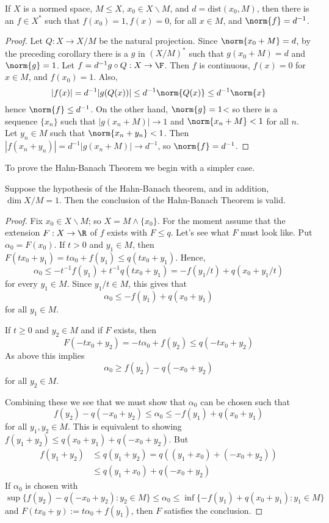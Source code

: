 \begin{cor}\label{cor:distFunc}
    If $X$ is a normed space, $M \leq X$, $x_0 \in X\backslash M$, and $d = \text{dist}(x_0,M)$, then there is an $f \in X^*$ such that $f(x_0) = 1, f(x) = 0$, for all $x \in M$, and $\norm{f} = d^{-1}$.
\end{cor}
\begin{proof}
    Let $Q:X\rightarrow X/M$ be the natural projection. Since $\norm{x_0+M} = d$, by the preceding corollary there is a $g$ in $(X/M)^*$ such that $g(x_0+M) = d$ and $\norm{g} = 1$. Let $f = d^{-1}g\circ Q:X\rightarrow \F$. Then $f$ is continuous, $f(x) = 0$ for $x \in M$, and $f(x_0) = 1$. Also, $$|f(x)| = d^{-1}|g(Q(x))| \leq d^{-1}\norm{Q(x)} \leq d^{-1}\norm{x}$$
    hence $\norm{f} \leq d^{-1}$. On the other hand, $\norm{g} = 1$< so there is a sequence $\{x_n\}$ such that $|g(x_n+M)|\rightarrow 1$ and $\norm{x_n+M} < 1$ for all $n$. Let $y_n \in M$ such that $\norm{x_n+y_n} < 1$. Then $|f(x_n+y_n)| = d^{-1}|g(x_n+M)|\rightarrow d^{-1}$, so $\norm{f} = d^{-1}$.
\end{proof}


To prove the Hahn-Banach Theorem we begin with a simpler case.

\begin{lem}
    Suppose the hypothesis of the Hahn-Banach theorem, and in addition, $\dim X/M = 1$. Then the conclusion of the Hahn-Banach Theorem is valid.
\end{lem}
\begin{proof}
    Fix $x_0 \in X\backslash M$; so $X = M\land \{x_0\}$. For the moment assume that the extension $F:X\rightarrow \R$ of $f$ exists with $F \leq q$. Let's see what $F$ must look like. Put $\alpha_0 = F(x_0)$. If $t > 0$ and $y_1 \in M$, then $F(tx_0+y_1) = t\alpha_0+f(y_1) \leq q(tx_0+y_1)$. Hence, $$\alpha_0 \leq -t^{-1}f(y_1)+t^{-1}q(tx_0+y_1) = -f(y_1/t)+q(x_0+y_1/t)$$
    for every $y_1 \in M$. Since $y_1/t \in M$, this gives that $$\alpha_0\leq -f(y_1) + q(x_0+y_1)$$
    for all $y_1 \in M$.

    If $t \geq 0$ and $y_2 \in M$ and if $F$ exists, then $$F(-tx_0+y_2) = -t\alpha_0+f(y_2) \leq q(-tx_0+y_2)$$
    As above this implies $$\alpha_0 \geq f(y_2)-q(-x_0+y_2)$$
    for all $y_2 \in M$. 

    Combining these we see that we must show that $\alpha_0$ can be chosen such that $$f(y_2) - q(-x_0+y_2)\leq \alpha_0\leq -f(y_1)+q(x_0+y_1)$$
    for all $y_1,y_2 \in M$. This is equivalent to showing $f(y_1+y_2) \leq q(x_0+y_1)+q(-x_0+y_2)$. But \begin{align*}
        f(y_1+y_2) &\leq q(y_1+y_2) = q((y_1+x_0)+(-x_0+y_2)) \\
        &\leq q(y_1+x_0)+q(-x_0+y_2)
    \end{align*}
    If $\alpha_0$ is chosen with $$\sup\{f(y_2)-q(-x_0+y_2):y_2 \in M\}\leq \alpha_0\leq \inf\{-f(y_1)+q(x_0+y_1):y_1 \in M\}$$
    and $F(tx_0+y) := t\alpha_0+f(y_1)$, then $F$ satisfies the conclusion.
\end{proof}

